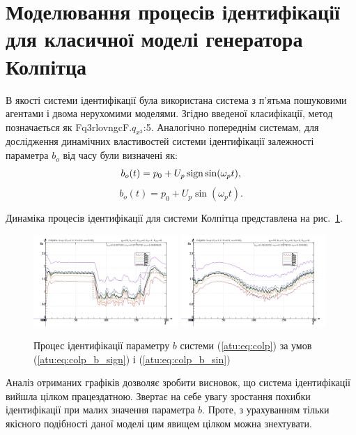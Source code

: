 \section{Моделювання процесів ідентифікації для класичної моделі генератора Колпітца} %

В якості системи ідентифікації була використана система з
п'ятьма пошуковими агентами і двома нерухомими моделями. Згідно
введеної класифікації, метод позначається як Fq3rlovngcF.$q_{x^2}$:5.
Аналогічно попереднім системам, для дослідження
динамічних властивостей системи ідентифікації залежності параметра
$ b_o $ від часу були визначені як:
%
\begin{equation}
 b_o(t) = p_0 + U_p \operatorname*{sign} \sin( \omega_p t ),
  \label{atu:eq:colp_b_sign}
\end{equation}
%
\begin{equation}
 b_o(t) = p_0 + U_p \sin( \omega_p t ).
  \label{atu:eq:colp_b_sin}
\end{equation}

Динаміка процесів ідентифікації для системи Колпітца
представлена на рис.~\ref{atu:f:colp_id}.

\begin{figure}[htb!]
\centerline{
  \includegraphics[width=0.49\textwidth]{p/mod/colp_m5p-pl_n_sign.png}
  \includegraphics[width=0.49\textwidth]{p/mod/colp_m5p-pl_n_sin.png}
}
\caption{Процес ідентифікації параметру $b$ системи (\ref{atu:eq:colp})
  за умов (\ref{atu:eq:colp_b_sign}) і (\ref{atu:eq:colp_b_sin})
}
\label{atu:f:colp_id}
\end{figure}

Аналіз отриманих графіків дозволяє зробити висновок, що
система ідентифікації вийшла цілком працездатною. Звертає
на себе увагу зростання похибки ідентифікації при малих
значення параметра
$ b $. Проте, з урахуванням тільки якісного подібності даної
моделі цим явищем цілком можна знехтувати.


